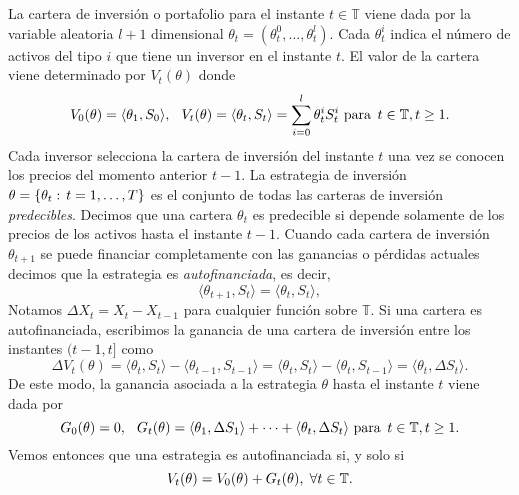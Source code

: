 La cartera de inversión o portafolio para el instante $ t \in \mathbb{T} $ viene dada por la variable aleatoria $ l+1 $ dimensional $ \theta_t = (\theta_t^0,\dots,\theta_t^l) $. Cada $ \theta_t^i $ indica el número de activos del tipo $ i $ que tiene un inversor en el instante $ t $. El valor de la cartera viene determinado por $ V_t(\theta) $ donde
\[
V_0(\theta) = \langle \theta_1 , S_0\rangle, \hspace{2.5mm} V_t(\theta) = \langle \theta_t , S_t\rangle = \sum_{i=0}^{l} \theta_t^i S_t^i \text{ para } \hspace{0.5mm} t \in \mathbb{T}, t \geq 1.
\]
Cada inversor selecciona la cartera de inversión del instante $ t $ una vez se conocen los precios del momento anterior $ t-1 $. La estrategia de inversión $ \theta = \{\theta_t: \hspace{0.5mm}t=1,\dots,T\} $ es el conjunto de todas las carteras de inversión \textit{predecibles}. Decimos que una cartera $ \theta_{t} $ es predecible si depende solamente de los precios de los activos hasta el instante $ t-1 $. Cuando cada cartera de inversión $ \theta_{t+1} $ se puede financiar completamente con las ganancias o pérdidas actuales decimos que la estrategia es \textit{autofinanciada}, es decir, 
\begin{equation*}\label{selfinance}
\langle \theta_{t+1}, S_t \rangle = \langle \theta_{t}, S_t \rangle,
\end{equation*} Notamos $ \Delta X_t = X_t - X_{t-1} $ para cualquier función sobre $ \mathbb{T} $. Si una cartera es autofinanciada, escribimos la ganancia de una cartera de inversión entre los instantes $ (t-1,t] $ como 
\[
\Delta V_t(\theta) = \langle\theta_t, S_t \rangle - \langle\theta_{t-1}, S_{t-1}\rangle = \langle\theta_t, S_t \rangle - \langle\theta_{t}, S_{t-1}\rangle = \langle\theta_{t}, \Delta S_{t}\rangle.
\]
De este modo, la ganancia asociada a la estrategia $ \theta $ hasta el instante $ t $ viene dada por
\[
G_0(\theta) = 0, \hspace{2.5mm} G_t(\theta) = \langle\theta_{1}, \Delta S_{1}\rangle + \cdots + \langle\theta_{t}, \Delta S_{t}\rangle \text{ para } \hspace{0.5mm} t \in \mathbb{T}, t \geq 1.
\]
Vemos entonces que una estrategia es autofinanciada si, y solo si
\begin{equation}\label{selfinifonlyif}
V_t(\theta) = V_0(\theta) + G_t(\theta), \hspace{1mm} \forall t \in \mathbb{T}.
\end{equation}

